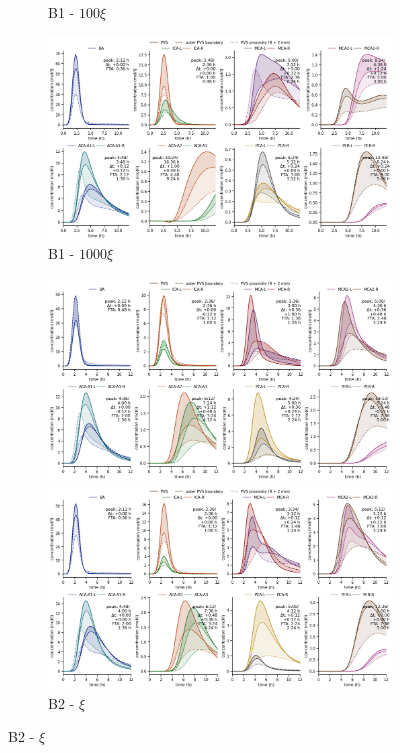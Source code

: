 \begin{figure}
\begin{subfigure}{0.5 \linewidth}
    \caption{B1 - $100 \xi$}
    \includegraphics[width=1\linewidth]{figures/modelB1-1000_conc_at_label.png}
    \caption{B1 - $1000 \xi$}
\end{subfigure}
\begin{subfigure}{0.5 \linewidth}
    \centering
    \includegraphics[width=1\linewidth]{figures/modelB2-1_conc_at_label.png}
    \caption{B2 - $\xi$}
    \includegraphics[width=1\linewidth]{figures/modelB2-10_conc_at_label.png}

\end{subfigure}
\end{figure}
